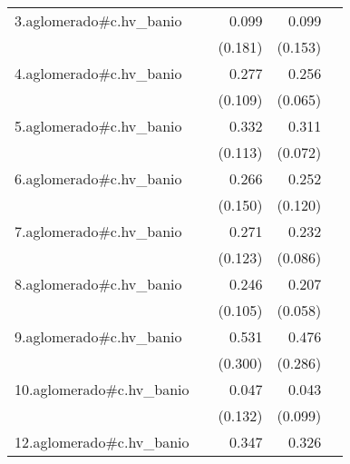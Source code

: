 {\begin{longtable}{l*{4}{D{.}{.}{-1}}}
\addlinespace
3.aglomerado#c.hv\_banio&                     &       0.099         &       0.099         &                     \\
            &                     &     (0.181)         &     (0.153)         &                     \\
\addlinespace
4.aglomerado#c.hv\_banio&                     &       0.277\sym{*}  &       0.256\sym{***}&                     \\
            &                     &     (0.109)         &     (0.065)         &                     \\
\addlinespace
5.aglomerado#c.hv\_banio&                     &       0.332\sym{**} &       0.311\sym{***}&                     \\
            &                     &     (0.113)         &     (0.072)         &                     \\
\addlinespace
6.aglomerado#c.hv\_banio&                     &       0.266         &       0.252\sym{*}  &                     \\
            &                     &     (0.150)         &     (0.120)         &                     \\
\addlinespace
7.aglomerado#c.hv\_banio&                     &       0.271\sym{*}  &       0.232\sym{**} &                     \\
            &                     &     (0.123)         &     (0.086)         &                     \\
\addlinespace
8.aglomerado#c.hv\_banio&                     &       0.246\sym{*}  &       0.207\sym{***}&                     \\
            &                     &     (0.105)         &     (0.058)         &                     \\
\addlinespace
9.aglomerado#c.hv\_banio&                     &       0.531         &       0.476         &                     \\
            &                     &     (0.300)         &     (0.286)         &                     \\
\addlinespace
10.aglomerado#c.hv\_banio&                     &       0.047         &       0.043         &                     \\
            &                     &     (0.132)         &     (0.099)         &                     \\
\addlinespace
12.aglomerado#c.hv\_banio&                     &       0.347\sym{**} &       0.326\sym{***}&                     \\

\end{longtable}}
